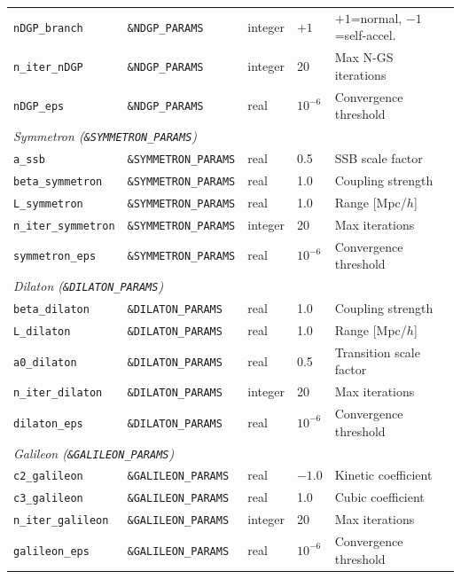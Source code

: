 \documentclass[fleqn,usenatbib]{mnras}
\newcommand{\code}[1]{\texttt{#1}}
\begin{document}
\begin{table}
\begin{tabular}{lllll}
\code{nDGP\_branch}    & \code{\&NDGP\_PARAMS}     & integer & $+1$ & $+1$=normal, $-1$=self-accel. \\
\code{n\_iter\_nDGP}   & \code{\&NDGP\_PARAMS}     & integer & 20  & Max N-GS iterations \\
\code{nDGP\_eps}       & \code{\&NDGP\_PARAMS}     & real    & $10^{-6}$ & Convergence threshold \\
\midrule
\multicolumn{5}{l}{\emph{Symmetron (\code{\&SYMMETRON\_PARAMS})}} \\
\code{a\_ssb}          & \code{\&SYMMETRON\_PARAMS} & real   & 0.5 & SSB scale factor \\
\code{beta\_symmetron} & \code{\&SYMMETRON\_PARAMS} & real   & 1.0 & Coupling strength \\
\code{L\_symmetron}    & \code{\&SYMMETRON\_PARAMS} & real   & 1.0 & Range [Mpc/$h$] \\
\code{n\_iter\_symmetron} & \code{\&SYMMETRON\_PARAMS} & integer & 20 & Max iterations \\
\code{symmetron\_eps}  & \code{\&SYMMETRON\_PARAMS} & real   & $10^{-6}$ & Convergence threshold \\
\midrule
\multicolumn{5}{l}{\emph{Dilaton (\code{\&DILATON\_PARAMS})}} \\
\code{beta\_dilaton}   & \code{\&DILATON\_PARAMS}  & real    & 1.0 & Coupling strength \\
\code{L\_dilaton}      & \code{\&DILATON\_PARAMS}  & real    & 1.0 & Range [Mpc/$h$] \\
\code{a0\_dilaton}     & \code{\&DILATON\_PARAMS}  & real    & 0.5 & Transition scale factor \\
\code{n\_iter\_dilaton}& \code{\&DILATON\_PARAMS}  & integer & 20  & Max iterations \\
\code{dilaton\_eps}    & \code{\&DILATON\_PARAMS}  & real    & $10^{-6}$ & Convergence threshold \\
\midrule
\multicolumn{5}{l}{\emph{Galileon (\code{\&GALILEON\_PARAMS})}} \\
\code{c2\_galileon}    & \code{\&GALILEON\_PARAMS} & real    & $-1.0$ & Kinetic coefficient \\
\code{c3\_galileon}    & \code{\&GALILEON\_PARAMS} & real    & 1.0 & Cubic coefficient \\
\code{n\_iter\_galileon}& \code{\&GALILEON\_PARAMS}& integer & 20  & Max iterations \\
\code{galileon\_eps}   & \code{\&GALILEON\_PARAMS} & real    & $10^{-6}$ & Convergence threshold \\

\end{tabular}
\end{table}
\end{document}
